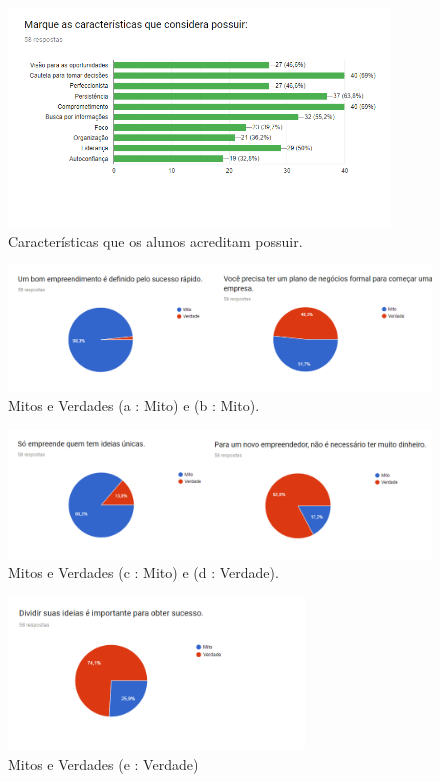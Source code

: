 \begin{figure}[H]
    \centering
    \includegraphics[width=0.9\textwidth]{img/habilidades.PNG}
    \caption{Características que os alunos acreditam possuir.}
    \label{fig:caract}
\end{figure}

\begin{figure}[!h]
    \centering
    \includegraphics[width=1.0\textwidth]{img/mv1-2.png}
    \caption{Mitos e Verdades (a : Mito) e (b : Mito).}
    \label{fig:mv1-2}
\end{figure}

\begin{figure}[!h]
    \centering
    \includegraphics[width=1.0\textwidth]{img/mv3-4.png}
    \caption{ Mitos e Verdades (c : Mito) e (d : Verdade).}
    \label{fig:mv3-4}
\end{figure}

\begin{figure}[!h]
    \centering
    \includegraphics[width=0.7\textwidth]{img/mv5.PNG}
    \caption{Mitos e Verdades (e : Verdade)}
    \label{fig:mv5}
\end{figure}

